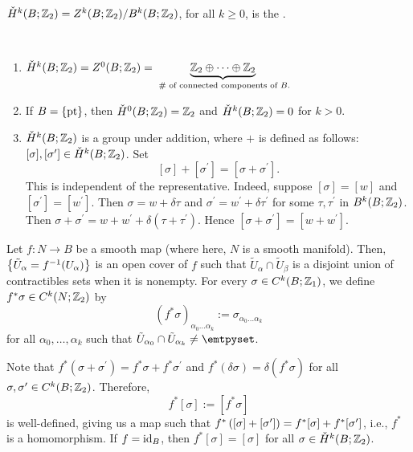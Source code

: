 \documentclass[main.tex]{subfiles}
\begin{document}
  \begin{defn}
      $\check{H}^k(B;\mathbb{Z}_2) = Z^k(B;\mathbb{Z}_2) / B^k(B; \mathbb{Z}_2)$, for all $k \geq 0$, is the .
  \end{defn}

  \begin{note}
    \hspace{1em} \\
    \begin{enumerate}
      \item $\check{H}^k(B;\mathbb{Z}_2) = Z^0(B;\mathbb{Z}_2) = \underbrace{\mathbb{Z}_2 \oplus \dots \oplus \mathbb{Z}_2}_{\text{ \# of connected components of $B$.}}$
      \item If $B = \left\{\text{pt}\right\}$, then $\check{H}^0(B; \mathbb{Z}_2) = \mathbb{Z}_2$ and $\check{H}^k(B; \mathbb{Z}_2) = 0$ for $k > 0$.
      \item $\check{H}^k(B;\mathbb{Z}_2)$ is a group under addition, where $+$ is defined as follows: $[\sigma], [\sigma^\prime] \in \check{H}^k(B;\mathbb{Z}_2)$. Set
      \[
      [\sigma]+[\sigma^\prime] = [\sigma+\sigma^\prime].
      \] This is independent of the representative. Indeed, suppose $[\sigma] = [w]$ and $[\sigma^\prime] = [w^\prime]$. Then $\sigma = w + \delta \tau$ and $\sigma^\prime = w^\prime + \delta \tau^\prime$ for some $\tau, \tau^\prime$ in $B^k(B; \mathbb{Z}_2)$. Then $\sigma + \sigma^\prime = w +
       w^\prime + \delta(\tau + \tau^\prime)$. Hence $[\sigma + \sigma^\prime] = [w + w^\prime]$.
    \end{enumerate}
  \end{note}

  \begin{defn}
    Let $f: N \to B$ be a smooth map (where here, $N$ is a smooth manifold). Then, $\left\{\tilde{U}_\alpha = f^{-1}(U_\alpha)\right\}$ is an open cover of $f$ such that $\tilde{U}_\alpha \cap \tilde{U}_\beta$ is a disjoint union of contractibles sets when it is nonempty. For every $\sigma \in C^k(B; \mathbb{Z}_1)$, we define $f^* \sigma \in C^k(N; \mathbb{Z}_2)$ by
    \[
    (f^*\sigma)_{\alpha_0\dots\alpha_k} := \sigma_{\alpha_0\dots \alpha_k}
    \] for all $\alpha_0,\dots, \alpha_k$ such that $\tilde{U}_{\alpha_0} \cap \tilde{U}_{\alpha_k} \neq \emtpyset$.
  \end{defn}

  Note that $f^*(\sigma + \sigma^\prime) = f^{*}\sigma + f^* \sigma^\prime$ and
  $f^*(\delta \sigma) = \delta(f^* \sigma)$ for all $\sigma, \sigma^\prime \in C^k(B; \mathbb{Z}_2)$. Therefore,
  \[
  f^*[\sigma] := [f^*\sigma]
  \] is well-defined, giving us a map
   such that $f^*\left( [\sigma] + [\sigma^\prime]  \right) = f^*[\sigma] + f^*[\sigma^\prime]$, i.e., $f^*$ is a homomorphism. If $f = \text{id}_{B}$, then $f^*[\sigma] = [\sigma]$ for all $\sigma \in \check{H}^k(B;\mathbb{Z}_2)$.
\end{document}
